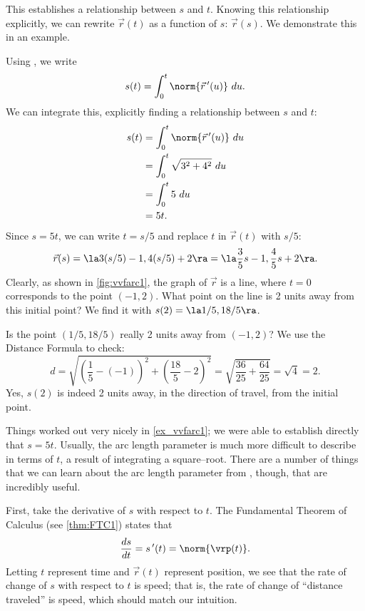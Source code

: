 This establishes a relationship between $s$ and $t$. Knowing this relationship explicitly, we can rewrite $\vec r(t)$ as a function of $s$: $\vec r(s)$. We demonstrate this in an example.

{Using , we write
$$s(t) = \int_0^t \norm{\vec r\,'(u)}\ du.$$
We can integrate this, explicitly finding a relationship between $s$ and $t$:
\begin{align*}
s(t) &= \int_0^t \norm{\vec r\,'(u)}\ du \\
			&= \int_0^t \sqrt{3^2+4^2}\ du\\
			&= \int_0^t 5\ du\\
			&= 5t.
\end{align*}
Since $s=5t$, we can write $t=s/5$ and replace $t$ in $\vec r(t)$ with $s/5$:
$$\vec r(s) = \la 3(s/5)-1, 4(s/5)+2\ra = \la \frac35s-1,\frac45s+2\ra.$$
Clearly, as shown in \autoref{fig:vvfarc1}, the graph of $\vec r$ is a line, where $t=0$ corresponds to the point $(-1,2)$. What point on the line is 2 units away from this initial point? We find it with $s(2) = \la 1/5, 18/5\ra$. 

Is the point $(1/5,18/5)$ really 2 units away from $(-1,2)$? We use the Distance Formula to check:
$$d = \sqrt{\left(\frac15-(-1)\right)^2+ \left(\frac{18}5-2\right)^2} = \sqrt{\frac{36}{25}+\frac{64}{25}} = \sqrt{4}=2.$$
Yes, $s(2)$ is indeed 2 units away, in the direction of travel, from the initial point.}

Things worked out very nicely in \autoref{ex_vvfarc1}; we were able to establish directly that $s=5t$. Usually, the arc length parameter is much more difficult to describe in terms of $t$, a result of integrating a square--root. There are a number of things that we can learn about the arc length parameter from , though, that are incredibly useful.

First, %
take the derivative of $s$ with respect to $t$. The Fundamental Theorem of Calculus (see \autoref{thm:FTC1}) states that
\begin{equation}
\frac{ds}{dt}=s\,'(t) = \norm{\vrp(t)}.\label{eq:vvfarc3}
\end{equation}
Letting $t$ represent time and $\vec r(t)$ represent position, we see that the rate of change of $s$ with respect to $t$ is speed; that is, the rate of change of ``distance traveled'' is speed, which should match our intuition.

